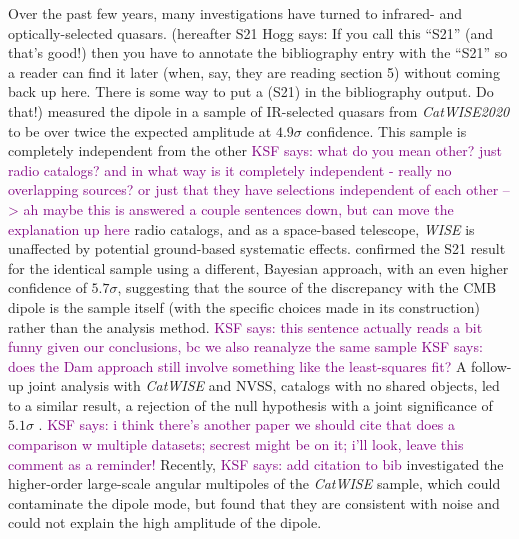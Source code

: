 \documentclass[modern]{aastex631}
\newcommand{\ksf}[1]{\textcolor{purple}{KSF says: #1}}
\newcommand{\hogg}[1]{\textcolor{hoggpink}{Hogg says: #1}}
\newcommand{\catwise}{\textsl{CatWISE}\xspace}
\newcommand{\catwisetwentytwenty}{\textsl{CatWISE2020}\xspace}
\begin{document}
Over the past few years, many investigations have turned to infrared- and optically-selected quasars.
\citet{secrest_test_2021} (hereafter S21 \hogg{If you call this ``S21'' (and that's good!) then you have to annotate the bibliography entry with the ``S21'' so a reader can find it later (when, say, they are reading section 5) without coming back up here. There is some way to put a (S21) in the bibliography output. Do that!}) measured the dipole in a sample of IR-selected quasars from \catwisetwentytwenty to be over twice the expected amplitude at $4.9\sigma$ confidence.
This sample is completely independent from the other \ksf{what do you mean other? just radio catalogs? and in what way is it completely independent - really no overlapping sources? or just that they have selections independent of each other --> ah maybe this is answered a couple sentences down, but can move the explanation up here} radio catalogs, and as a space-based telescope, \textit{WISE} is unaffected by potential ground-based systematic effects.
\citet{dam_testing_2022} confirmed the S21 result for the identical sample using a different, Bayesian approach, with an even higher confidence of $5.7\sigma$, suggesting that the source of the discrepancy with the CMB dipole is the sample itself (with the specific choices made in its construction) rather than the analysis method. \ksf{this sentence actually reads a bit funny given our conclusions, bc we also reanalyze the same sample } \ksf{does the Dam approach still involve something like the least-squares fit?}
A follow-up joint analysis with \catwise and NVSS, catalogs with no shared objects, led to a similar result, a rejection of the null hypothesis with a joint significance of $5.1\sigma$ \citep{secrest_challenge_2022}.
\ksf{i think there's another paper we should cite that does a comparison w multiple datasets; secrest might be on it; i'll look, leave this comment as a reminder!}
Recently, \cite{von_hausegger_clustering_2025} \ksf{add citation to bib} investigated the higher-order large-scale angular multipoles of the \catwise sample, which could contaminate the dipole mode, but found that they are consistent with noise and could not explain the high amplitude of the dipole.
\end{document}
